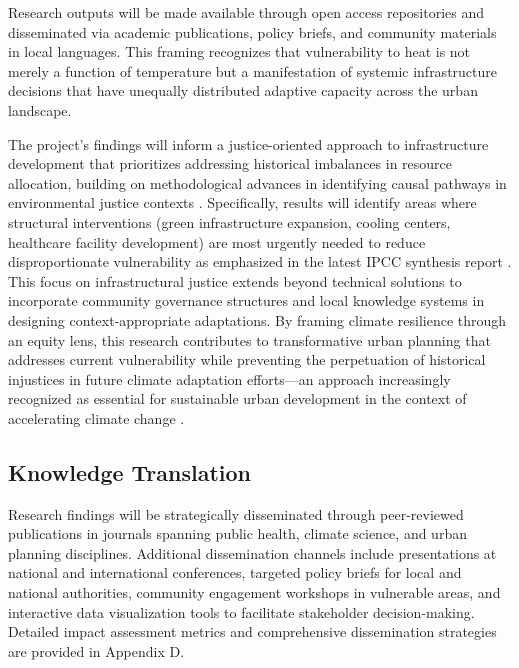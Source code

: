 Research outputs will be made available through open access repositories and disseminated via academic publications, policy briefs, and community materials in local languages. This framing recognizes that vulnerability to heat is not merely a function of temperature but a manifestation of systemic infrastructure decisions that have unequally distributed adaptive capacity across the urban landscape.

The project's findings will inform a justice-oriented approach to infrastructure development that prioritizes addressing historical imbalances in resource allocation, building on methodological advances in identifying causal pathways in environmental justice contexts \citep{Velasquez2023}. Specifically, results will identify areas where structural interventions (green infrastructure expansion, cooling centers, healthcare facility development) are most urgently needed to reduce disproportionate vulnerability as emphasized in the latest IPCC synthesis report \citep{IPCC2024}. This focus on infrastructural justice extends beyond technical solutions to incorporate community governance structures and local knowledge systems in designing context-appropriate adaptations. By framing climate resilience through an equity lens, this research contributes to transformative urban planning that addresses current vulnerability while preventing the perpetuation of historical injustices in future climate adaptation efforts—an approach increasingly recognized as essential for sustainable urban development in the context of accelerating climate change \citep{Praharaj2024}.

\subsection{Knowledge Translation}
Research findings will be strategically disseminated through peer-reviewed publications in journals spanning public health, climate science, and urban planning disciplines. Additional dissemination channels include presentations at national and international conferences, targeted policy briefs for local and national authorities, community engagement workshops in vulnerable areas, and interactive data visualization tools to facilitate stakeholder decision-making. Detailed impact assessment metrics and comprehensive dissemination strategies are provided in Appendix D.